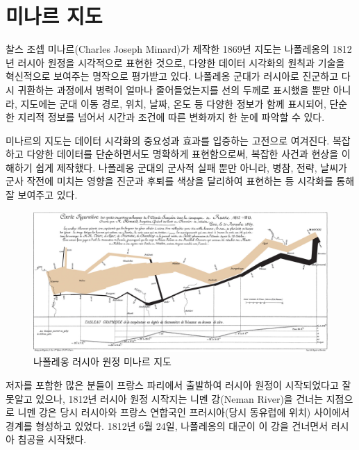 \documentclass[
  letterpaper,
  chapter,a4paper,showtrims,openright,hidelinks]{oblivoir}
\begin{document}
\hypertarget{uxbbf8uxb098uxb974-uxc9c0uxb3c4}{%
\section{미나르 지도}\label{uxbbf8uxb098uxb974-uxc9c0uxb3c4}}

찰스 조셉 미나르(Charles Joseph Minard)가 제작한 1869년 지도는
나폴레옹의 1812년 러시아 원정을 시각적으로 표현한 것으로, 다양한 데이터
시각화의 원칙과 기술을 혁신적으로 보여주는 명작으로 평가받고 있다.
나폴레옹 군대가 러시아로 진군하고 다시 귀환하는 과정에서 병력이 얼마나
줄어들었는지를 선의 두께로 표시했을 뿐만 아니라, 지도에는 군대 이동
경로, 위치, 날짜, 온도 등 다양한 정보가 함께 표시되어, 단순한 지리적
정보를 넘어서 시간과 조건에 따른 변화까지 한 눈에 파악할 수 있다.

미나르의 지도는 데이터 시각화의 중요성과 효과를 입증하는 고전으로
여겨진다. 복잡하고 다양한 데이터를 단순하면서도 명확하게 표현함으로써,
복잡한 사건과 현상을 이해하기 쉽게 제작했다. 나폴레옹 군대의 군사적 실패
뿐만 아니라, 병참, 전략, 날씨가 군사 작전에 미치는 영향을 진군과 후퇴를
색상을 달리하여 표현하는 등 시각화를 통해 잘 보여주고 있다.

\begin{figure}

{\centering \includegraphics{images/Minard.png}

}

\caption{나폴레옹 러시아 원정 미나르 지도}

\end{figure}

저자를 포함한 많은 분들이 프랑스 파리에서 출발하여 러시아 원정이
시작되었다고 잘못알고 있으나, 1812년 러시아 원정 시작지는 니멘 강(Neman
River)을 건너는 지점으로 니멘 강은 당시 러시아와 프랑스 연합국인
프러시아(당시 동유럽에 위치) 사이에서 경계를 형성하고 있었다. 1812년 6월
24일, 나폴레옹의 대군이 이 강을 건너면서 러시아 침공을 시작됐다.
\end{document}
